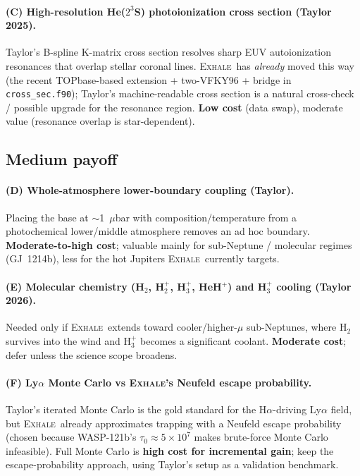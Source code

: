 \documentclass[11pt]{article}
\newcommand{\EXHALE}{\textsc{Exhale}}
\begin{document}
\paragraph{(C) High-resolution He($2^3$S) photoionization cross section (Taylor 2025).}
Taylor's B-spline K-matrix cross section resolves sharp EUV autoionization resonances that
overlap stellar coronal lines. \EXHALE\ has \emph{already} moved this way (the recent
TOPbase-based extension + two-VFKY96 + bridge in \texttt{cross\_sec.f90}); Taylor's
machine-readable cross section is a natural cross-check / possible upgrade for the resonance
region. \textbf{Low cost} (data swap), moderate value (resonance overlap is star-dependent).

\subsection{Medium payoff}

\paragraph{(D) Whole-atmosphere lower-boundary coupling (Taylor).}
Placing the base at $\sim$1~$\mu$bar with composition/temperature from a photochemical
lower/middle atmosphere removes an ad hoc boundary. \textbf{Moderate-to-high cost}; valuable
mainly for sub-Neptune / molecular regimes (GJ~1214b), less for the hot Jupiters \EXHALE\
currently targets.

\paragraph{(E) Molecular chemistry (H$_2$, H$_2^+$, H$_3^+$, HeH$^+$) and H$_3^+$ cooling
(Taylor 2026).}
Needed only if \EXHALE\ extends toward cooler/higher-$\mu$ sub-Neptunes, where H$_2$ survives
into the wind and H$_3^+$ becomes a significant coolant. \textbf{Moderate cost}; defer unless
the science scope broadens.

\paragraph{(F) Ly$\alpha$ Monte Carlo vs \EXHALE's Neufeld escape probability.}
Taylor's iterated Monte Carlo is the gold standard for the H$\alpha$-driving Ly$\alpha$
field, but \EXHALE\ already approximates trapping with a Neufeld escape probability (chosen
because WASP-121b's $\tau_0\approx5\times10^7$ makes brute-force Monte Carlo infeasible). Full
Monte Carlo is \textbf{high cost for incremental gain}; keep the escape-probability approach,
using Taylor's setup as a validation benchmark.
\end{document}
